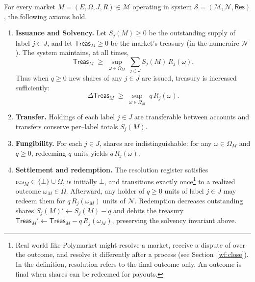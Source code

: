 \begin{definition}\label{def:system} For every market $M=(E,\Omega,J,R)\in\mathcal{M}$ operating in system $\mathcal{S}=(\mathcal{M},\mathcal{N},\mathsf{Res})$, the following axioms hold.

\begin{enumerate}

\item \textbf{Issuance and Solvency.}
Let $S_j(M)\ge 0$ be the outstanding supply of label $j\in J$, and let $\mathsf{Treas}_M\ge 0$ be the market’s treasury (in the numeraire $\mathcal{N}$). The system maintains, at all times,
\[
  \mathsf{Treas}_M \;\ge\; \sup_{\omega\in\Omega_M}\; \sum_{j\in J} S_j(M)\,R_j(\omega).
\]
Thus when $q\ge 0$ new shares of any $j\in J$ are issued, treasury is increased sufficiently:
\[
  \Delta \mathsf{Treas}_M \;\ge\; \sup_{\omega\in\Omega_M}\; q\,R_j(\omega).
\]

\item \textbf{Transfer.} Holdings of each label $j\in J$ are transferable between accounts and transfers conserve per–label totals $S_j(M)$.
 
\item \textbf{Fungibility.} For each $j\in J$, shares are indistinguishable: for any $\omega\in\Omega_M$ and $q\ge 0$,
redeeming $q$ units yields $q\,R_j(\omega)$.
  
  
  \item \textbf{Settlement and redemption.} The resolution register satisfies $\mathrm{res}_M\in\{\bot\}\cup\Omega$, is initially $\bot$, and transitions exactly once\footnote{Real world \depms like Polymarket might resolve a market, receive a dispute of over the outcome, and resolve it differently after a process (see Section~\ref{wf:close}). In the definition, resolution refers to the final outcome only. An outcome is final when shares can be redeemed for payouts.} to a realized outcome $\omega_M\in\Omega$. Afterward, any holder of $q\ge 0$ units of label $j\in J$ may redeem them for $q\,R_j(\omega_M)$ units of $\mathcal{N}$. Redemption decreases outstanding shares $S_j(M)'\leftarrow S_j(M)-q$ and debits the treasury $\mathsf{Treas}_M'\leftarrow \mathsf{Treas}_M - q\,R_j(\omega_M)$, preserving the solvency invariant above.
 
 \end{enumerate}
 \end{definition}



